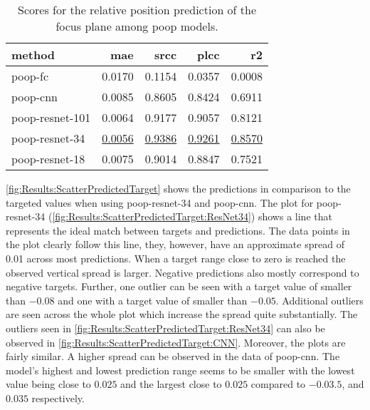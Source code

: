 \begin{table}
    \centering
    \caption[Relative position prediction scores]{Scores for the relative position prediction of the focus plane among \acs{poop} models.}
    \begin{tabular}{lrrrr}
        \hline
        method          & \acs{mae} & \acs{srcc} & \acs{plcc} & \acs{r2} \\
        \hline
        \acs{poop}-\acs{fc}             & 0.0170 & 0.1154 & 0.0357 & 0.0008 \\
        \acs{poop}-\acs{cnn}            & 0.0085 & 0.8605 & 0.8424 & 0.6911 \\
        \acs{poop}-\acs{resnet}-101     & 0.0064 & 0.9177 & 0.9057 & 0.8121 \\
        \acs{poop}-\acs{resnet}-34      & \underline{0.0056} & \underline{0.9386} & \underline{0.9261} & \underline{0.8570} \\
        \acs{poop}-\acs{resnet}-18      & 0.0075 & 0.9014 & 0.8847 & 0.7521 \\
    \end{tabular}
    \label{tab:Results:Models:Accuracy}
\end{table}

\FloatBarrier

\autoref{fig:Results:ScatterPredictedTarget} shows the predictions in comparison to the targeted values when using \acs{poop}-\acs{resnet}-34 and \acs{poop}-\acs{cnn}. The plot for \acs{poop}-\acs{resnet}-34 (\autoref{fig:Results:ScatterPredictedTarget:ResNet34}) shows a line that represents the ideal match between targets and predictions. The data points in the plot clearly follow this line, they, however, have an approximate spread of 0.01 across most predictions. When a target range close to zero is reached the observed vertical spread is larger. Negative predictions also mostly correspond to negative targets. Further, one outlier can be seen with a target value of smaller than $-0.08$ and one with a target value of smaller than $-0.05$. Additional outliers are seen across the whole plot which increase the spread quite substantially. The outliers seen in \autoref{fig:Results:ScatterPredictedTarget:ResNet34} can also be observed in \autoref{fig:Results:ScatterPredictedTarget:CNN}. Moreover, the plots are fairly similar. A higher spread can be observed in the data of \acs{poop}-\acs{cnn}. The model's highest and lowest prediction range seems to be smaller with the lowest value being close to $0.025$ and the largest close to $0.025$ compared to $-0.03.5$, and $0.035$ respectively.


